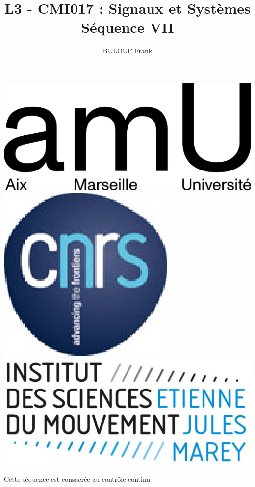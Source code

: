 \documentclass[a4paper,11pt]{beamer}
\title{L3 - CMI017 : Signaux et Systèmes\\Séquence VII}
\author{BULOUP Frank}
\institute{Aix Marseille Université\\Institut des Sciences du Mouvement}
\date{}
\begin{document}
\begin{frame}[plain]  
	\titlepage  
	\vspace{1cm}
	
	\includegraphics[scale=0.6]{images/LogoAMU.png}\hspace*{2cm}
	\includegraphics[scale=0.2]{images/LogoCNRS.eps}\hspace*{2cm}  
	\includegraphics[scale=0.1]{images/LogoISM.eps}
\end{frame}  
  

\begin{frame}
\centering
Cette séquence est consacrée au contrôle continu
\end{frame}

 
 
\end{document}
